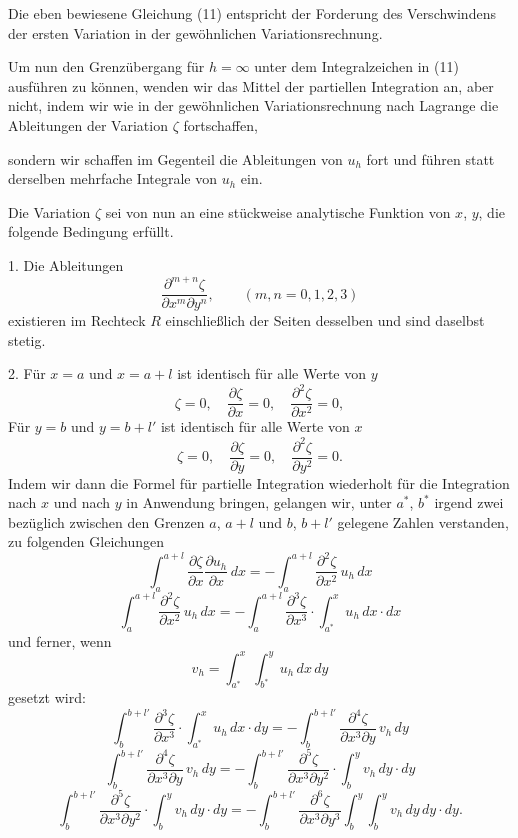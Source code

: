 \documentclass{article}
\begin{document}
Die eben bewiesene Gleichung (11) entspricht der Forderung des Verschwindens der ersten Variation in der gewöhnlichen Variationsrechnung.

Um nun den Grenzübergang für $h=\infty$ unter dem Integralzeichen in (11) ausführen zu können, wenden wir das Mittel der partiellen Integration an, aber nicht, indem wir wie in der gewöhnlichen Variationsrechnung nach Lagrange die Ableitungen der Variation $\zeta$ fortschaffen,

sondern wir schaffen im Gegenteil die Ableitungen von $u_h$ fort und führen statt derselben mehrfache Integrale von $u_h$ ein.

Die Variation $\zeta$ sei von nun an eine stückweise analytische Funktion von $x$, $y$, die folgende Bedingung erfüllt.

1. Die Ableitungen
\[
\frac{\partial^{m+n} \zeta}{\partial x^m \partial y^n}, \qquad (m, n = 0, 1, 2, 3)
\]
existieren im Rechteck $R$ einschließlich der Seiten desselben und sind daselbst stetig.

2. Für $x=a$ und $x=a+l$ ist identisch für alle Werte von $y$
\[
\zeta = 0, \quad \frac{\partial\zeta}{\partial x} = 0, \quad \frac{\partial^2\zeta}{\partial x^2} = 0,
\]
Für $y=b$ und $y=b+l'$ ist identisch für alle Werte von $x$
\[
\zeta = 0, \quad \frac{\partial\zeta}{\partial y} = 0, \quad \frac{\partial^2\zeta}{\partial y^2} = 0.
\]
Indem wir dann die Formel für partielle Integration wiederholt für die Integration nach $x$ und nach $y$ in Anwendung bringen, gelangen wir, unter $a^*$, $b^*$ irgend zwei bezüglich zwischen den Grenzen $a$, $a+l$ und $b$, $b+l'$ gelegene Zahlen verstanden, zu folgenden Gleichungen
\[
\int_a^{a+l} \frac{\partial\zeta}{\partial x} \frac{\partial u_h}{\partial x}\,dx = -\int_a^{a+l} \frac{\partial^2\zeta}{\partial x^2}\,u_h\,dx
\]
\[
\int_a^{a+l} \frac{\partial^2\zeta}{\partial x^2}\,u_h\,dx = -\int_a^{a+l} \frac{\partial^3\zeta}{\partial x^3} \cdot \int_{a^*}^x u_h\,dx \cdot dx
\]
und ferner, wenn
\[
v_h = \int_{a^*}^x \int_{b^*}^y u_h\,dx\,dy
\]
gesetzt wird:
\[
\int_b^{b+l'} \frac{\partial^3\zeta}{\partial x^3} \cdot \int_{a^*}^x u_h\,dx \cdot dy = -\int_b^{b+l'} \frac{\partial^4\zeta}{\partial x^3 \partial y}\,v_h\,dy
\]
\[
\int_b^{b+l'} \frac{\partial^4\zeta}{\partial x^3 \partial y}\,v_h\,dy = -\int_b^{b+l'} \frac{\partial^5\zeta}{\partial x^3 \partial y^2} \cdot \int_b^y v_h\,dy \cdot dy
\]
\[
\int_b^{b+l'} \frac{\partial^5\zeta}{\partial x^3 \partial y^2} \cdot \int_b^y v_h\,dy \cdot dy = -\int_b^{b+l'} \frac{\partial^6\zeta}{\partial x^3 \partial y^3} \int_b^y \int_b^y v_h\,dy\,dy \cdot dy.
\]
\end{document}
